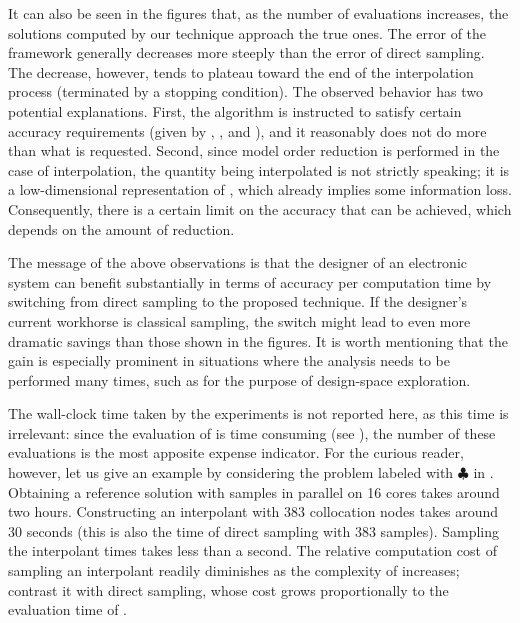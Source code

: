 It can also be seen in the figures that, as the number of evaluations increases,
the solutions computed by our technique approach the true ones. The error of the
framework generally decreases more steeply than the error of direct sampling.
The decrease, however, tends to plateau toward the end of the interpolation
process (terminated by a stopping condition). The observed behavior has two
potential explanations. First, the algorithm is instructed to satisfy certain
accuracy requirements (given by , , and ), and it
reasonably does not do more than what is requested. Second, since model order
reduction is performed in the case of interpolation, the quantity being
interpolated is not \g strictly speaking; it is a low-dimensional representation
of \g, which already implies some information loss. Consequently, there is a
certain limit on the accuracy that can be achieved, which depends on the amount
of reduction.

The message of the above observations is that the designer of an electronic
system can benefit substantially in terms of accuracy per computation time by
switching from direct sampling to the proposed technique. If the designer's
current workhorse is classical  sampling, the switch might lead to even
more dramatic savings than those shown in the figures. It is worth mentioning
that the gain is especially prominent in situations where the analysis needs to
be performed many times, such as for the purpose of design-space exploration.

\begin{remark}
The wall-clock time taken by the experiments is not reported here, as this time
is irrelevant: since the evaluation of \g is time consuming (see
), the number of these evaluations is the most apposite
expense indicator. For the curious reader, however, let us give an example by
considering the problem labeled with $\clubsuit$ in
. Obtaining a reference solution with
 samples in parallel on 16 cores takes around two hours.
Constructing an interpolant with 383 collocation nodes takes around 30 seconds
(this is also the time of direct sampling with 383 samples). Sampling the
interpolant  times takes less than a second. The relative
computation cost of sampling an interpolant readily diminishes as the complexity
of \g increases; contrast it with direct sampling, whose cost grows
proportionally to the evaluation time of \g.
\end{remark}

